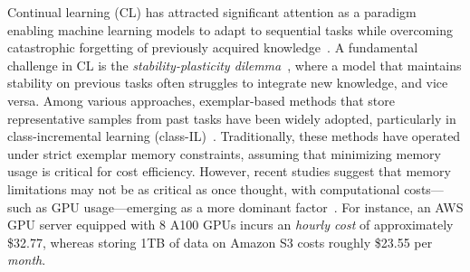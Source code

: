 

Continual learning (CL) has attracted significant attention as a paradigm enabling machine learning models to adapt to sequential tasks while overcoming catastrophic forgetting of previously acquired knowledge~\citep{wang2024comprehensive}.  
A fundamental challenge in CL is the \emph{stability-plasticity dilemma}~\citep{(spdilemma)carpenter87, (spdilemma)mermillod13}, where a model that maintains stability on previous tasks often struggles to integrate new knowledge, and vice versa. Among various approaches, exemplar-based methods that store representative samples from past tasks have been widely adopted, particularly in class-incremental learning (class-IL)~\citep{masana2022class}. Traditionally, these methods have operated under strict exemplar memory constraints, assuming that minimizing memory usage is critical for cost efficiency. However, recent studies suggest that memory limitations may not be as critical as once thought, with computational costs—such as GPU usage—emerging as a more dominant factor~\citep{prabhu2023computationally, chavan2023towards}. For instance, an AWS GPU server equipped with 8 A100 GPUs incurs an \textit{hourly cost} of approximately \$32.77, whereas storing 1TB of data on Amazon S3 costs roughly \$23.55 per \textit{month}.

